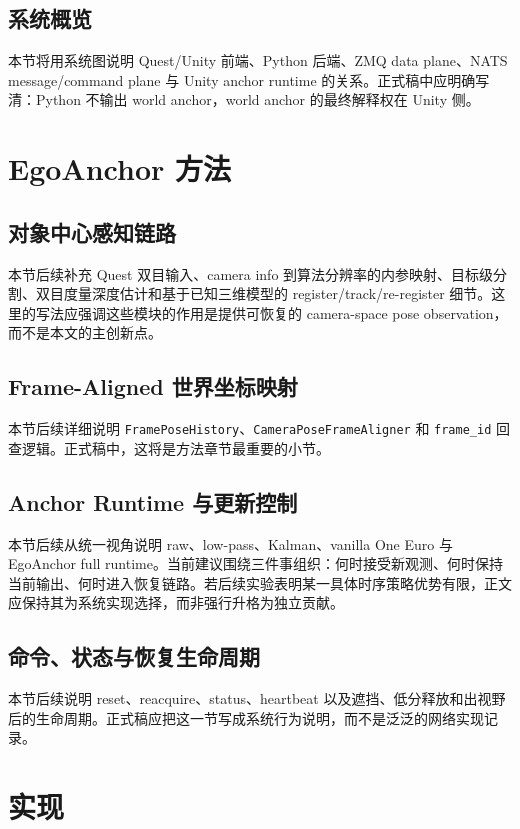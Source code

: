 \documentclass[review]{vgtc}
\begin{document}
\subsection{系统概览}
本节将用系统图说明 Quest/Unity 前端、Python 后端、ZMQ data plane、NATS message/command plane 与 Unity anchor runtime 的关系。正式稿中应明确写清：Python 不输出 world anchor，world anchor 的最终解释权在 Unity 侧。

\section{EgoAnchor 方法}

\subsection{对象中心感知链路}
本节后续补充 Quest 双目输入、camera info 到算法分辨率的内参映射、目标级分割、双目度量深度估计和基于已知三维模型的 register/track/re-register 细节。这里的写法应强调这些模块的作用是提供可恢复的 camera-space pose observation，而不是本文的主创新点。

\subsection{Frame-Aligned 世界坐标映射}
本节后续详细说明 \texttt{FramePoseHistory}、\texttt{CameraPoseFrameAligner} 和 \texttt{frame\_id} 回查逻辑。正式稿中，这将是方法章节最重要的小节。

\subsection{Anchor Runtime 与更新控制}
本节后续从统一视角说明 raw、low-pass、Kalman、vanilla One Euro 与 EgoAnchor full runtime。当前建议围绕三件事组织：何时接受新观测、何时保持当前输出、何时进入恢复链路。若后续实验表明某一具体时序策略优势有限，正文应保持其为系统实现选择，而非强行升格为独立贡献。

\subsection{命令、状态与恢复生命周期}
本节后续说明 reset、reacquire、status、heartbeat 以及遮挡、低分释放和出视野后的生命周期。正式稿应把这一节写成系统行为说明，而不是泛泛的网络实现记录。

\section{实现}
\end{document}
